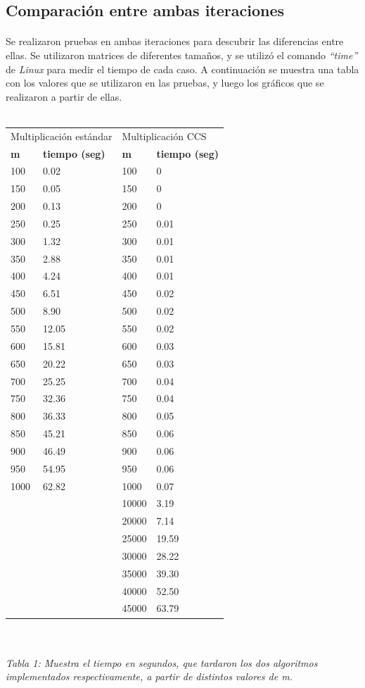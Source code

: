 \documentclass[a4paper,11pt]{article}
\begin{document}
\subsection{Comparaci\'on entre ambas iteraciones}
\paragraph{}
Se realizaron pruebas en ambas iteraciones para descubrir las diferencias entre ellas. Se utilizaron matrices de diferentes tamaños, y se utiliz\'o el comando \emph{``time''} de \emph{Linux} para medir el tiempo de cada caso. A continuaci\'on se muestra una tabla con los valores que se utilizaron en las pruebas, y luego los gr\'aficos que se realizaron a partir de ellas.\\
\\

\begin{tabular}{|l||l|l||l|}
\hline
\multicolumn{2}{|l|}{Multiplicaci\'on est\'andar}&\multicolumn{2}{l|}{Multiplicaci\'on CCS}\\
\cline{1-4}
\textbf{m}&\textbf{tiempo (seg)}&\textbf{m}&\textbf{tiempo (seg)}\\
\hline\hline
100 & 0.02 & 100 & 0\\
150 & 0.05 & 150 & 0\\
200 & 0.13 & 200 & 0\\
250 & 0.25 & 250 & 0.01\\
300 & 1.32 & 300 & 0.01\\
350 & 2.88 & 350 & 0.01\\
400 & 4.24 & 400 & 0.01\\
450 & 6.51 & 450 & 0.02\\
500 & 8.90 & 500 & 0.02\\
550 & 12.05 & 550 & 0.02\\
600 & 15.81 & 600 & 0.03\\
650 & 20.22 & 650 & 0.03\\
700 & 25.25 & 700 & 0.04\\
750 & 32.36 & 750 & 0.04\\
800 & 36.33 & 800 & 0.05\\
850 & 45.21 & 850 & 0.06\\
900 & 46.49 & 900 & 0.06\\
950 & 54.95 & 950 & 0.06\\
1000 & 62.82 & 1000 & 0.07\\
 &  & 10000 & 3.19\\
 &  & 20000 & 7.14\\
 &  & 25000 & 19.59\\
 &  & 30000 & 28.22\\
 &  & 35000 & 39.30\\
 &  & 40000 & 52.50\\
 &  & 45000 & 63.79\\
\hline
\end{tabular}\\
\\
\small\emph{Tabla 1: Muestra el tiempo en segundos, que tardaron los dos algoritmos implementados respectivamente, a partir de distintos valores de m.}
\end{document}
